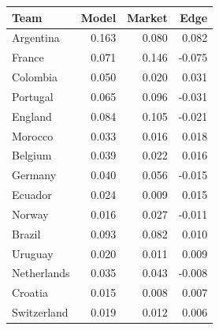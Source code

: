 \begin{tabular}{lrrr}
\toprule
Team & Model & Market & Edge \\
\midrule
Argentina & 0.163 & 0.080 & 0.082 \\
France & 0.071 & 0.146 & -0.075 \\
Colombia & 0.050 & 0.020 & 0.031 \\
Portugal & 0.065 & 0.096 & -0.031 \\
England & 0.084 & 0.105 & -0.021 \\
Morocco & 0.033 & 0.016 & 0.018 \\
Belgium & 0.039 & 0.022 & 0.016 \\
Germany & 0.040 & 0.056 & -0.015 \\
Ecuador & 0.024 & 0.009 & 0.015 \\
Norway & 0.016 & 0.027 & -0.011 \\
Brazil & 0.093 & 0.082 & 0.010 \\
Uruguay & 0.020 & 0.011 & 0.009 \\
Netherlands & 0.035 & 0.043 & -0.008 \\
Croatia & 0.015 & 0.008 & 0.007 \\
Switzerland & 0.019 & 0.012 & 0.006 \\
\bottomrule
\end{tabular}

